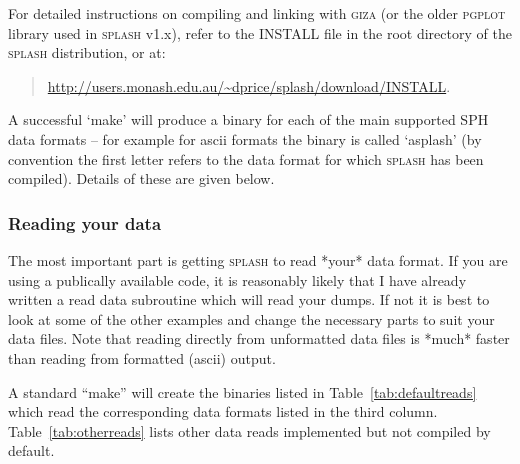 \documentclass[a4paper,10pt]{article}
\newcommand{\splash}{\textsc{splash }}
\newcommand{\giza}{\textsc{giza }}
\begin{document}
For detailed instructions on compiling and linking with \giza (or the older \textsc{pgplot} library used in \splash v1.x), refer to the INSTALL file in the root directory of the \splash distribution, or at:
\begin{quote}
 \url{http://users.monash.edu.au/~dprice/splash/download/INSTALL}.
\end{quote}

A successful `make' will produce a binary for each of the main supported SPH data formats -- for example for ascii formats the binary is called `asplash' (by convention the first letter refers to the data format for which \splash has been compiled). Details of these are given below.

\subsubsection{ Reading your data}
 The most important part is getting \splash to read *your* data format.
If you are using a publically available code, it is reasonably likely that I
have already written a read data subroutine which will read your dumps.
If not it is best to look at some of the other examples and change the 
necessary parts to suit your data files. Note that reading directly from
unformatted data files is *much* faster than reading from formatted (ascii)
output.   

A standard ``make'' will create the binaries listed in Table~\ref{tab:defaultreads} which read the corresponding data formats listed in the third column. Table~\ref{tab:otherreads} lists other data reads implemented but not compiled by default.
\end{document}
